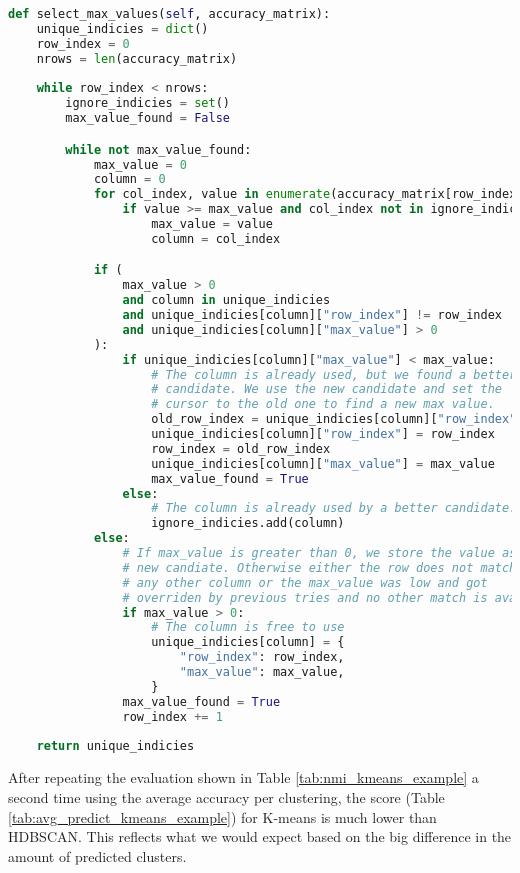 \begin{lstlisting}[language=Python, caption=Select relevant accuracy values from a accuracy matrix., label={lst:select_max_values}]
def select_max_values(self, accuracy_matrix):
    unique_indicies = dict()
    row_index = 0
    nrows = len(accuracy_matrix)
    
    while row_index < nrows:
        ignore_indicies = set()
        max_value_found = False

        while not max_value_found:
            max_value = 0
            column = 0
            for col_index, value in enumerate(accuracy_matrix[row_index]):
                if value >= max_value and col_index not in ignore_indicies:
                    max_value = value
                    column = col_index

            if (
                max_value > 0
                and column in unique_indicies
                and unique_indicies[column]["row_index"] != row_index
                and unique_indicies[column]["max_value"] > 0
            ):
                if unique_indicies[column]["max_value"] < max_value:
                    # The column is already used, but we found a better 
                    # candidate. We use the new candidate and set the 
                    # cursor to the old one to find a new max value.
                    old_row_index = unique_indicies[column]["row_index"]
                    unique_indicies[column]["row_index"] = row_index
                    row_index = old_row_index
                    unique_indicies[column]["max_value"] = max_value
                    max_value_found = True
                else:
                    # The column is already used by a better candidate.
                    ignore_indicies.add(column)
            else:
                # If max_value is greater than 0, we store the value as a 
                # new candiate. Otherwise either the row does not match 
                # any other column or the max_value was low and got 
                # overriden by previous tries and no other match is available. 
                if max_value > 0:
                    # The column is free to use
                    unique_indicies[column] = {
                        "row_index": row_index,
                        "max_value": max_value,
                    }
                max_value_found = True
                row_index += 1
    
    return unique_indicies
\end{lstlisting}

After repeating the evaluation shown in Table \ref{tab:nmi_kmeans_example} a second time using the average accuracy per clustering, the score (Table \ref{tab:avg_predict_kmeans_example}) for K-means is much lower than HDBSCAN. This reflects what we would expect based on the big difference in the amount of predicted clusters.

